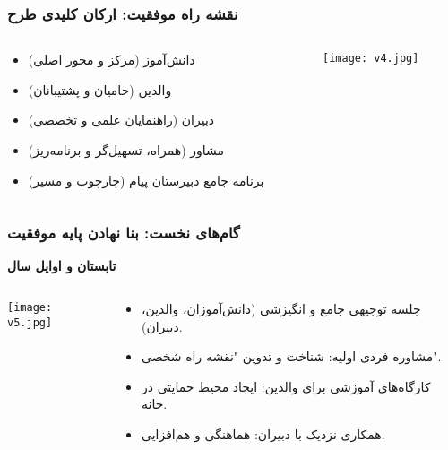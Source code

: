 \documentclass[aspectratio=169]{beamer}
\begin{document}
\begin{frame}[fragile]
  \frametitle{نقشه راه موفقیت: ارکان کلیدی طرح}

  \begin{columns}[T]
    \begin{column}{0.55\textwidth}
      \begin{itemize}
        \item دانش‌آموز (مرکز و محور اصلی)
        \item والدین (حامیان و پشتیبانان)
        \item دبیران (راهنمایان علمی و تخصصی)
        \item مشاور (همراه، تسهیل‌گر و برنامه‌ریز)
        \item برنامه جامع دبیرستان پیام (چارچوب و مسیر)
      \end{itemize}
    \end{column}

    \begin{column}{0.4\textwidth}
      \vspace{0.5cm}
      \texttt{[image: v4.jpg]}
    \end{column}
  \end{columns}
\end{frame}

\begin{frame}[fragile]
  \frametitle{گام‌های نخست: بنا نهادن پایه موفقیت}

  \begin{center}
    \textbf{تابستان و اوایل سال}
  \end{center}

  \begin{columns}[T]
    \begin{column}{0.35\textwidth}
      \vspace{0.5cm}
      \texttt{[image: v5.jpg]}
    \end{column}

    \begin{column}{0.6\textwidth}
      \begin{itemize}
        \item جلسه توجیهی جامع و انگیزشی (دانش‌آموزان، والدین، دبیران).
        \item مشاوره فردی اولیه: شناخت و تدوین "نقشه راه شخصی".
        \item کارگاه‌های آموزشی برای والدین: ایجاد محیط حمایتی در خانه.
        \item همکاری نزدیک با دبیران: هماهنگی و هم‌افزایی.
      \end{itemize}
    \end{column}
  \end{columns}
\end{frame}
\end{document}
